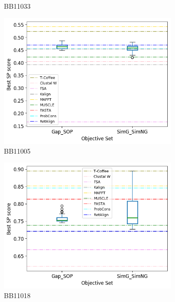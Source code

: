 \begin{figure}[!htbp]
\begin{adjustwidth}{-1cm}{-1cm}
\begin{subfigure}{0.22\textwidth}
			\caption{BB11033}
		\end{subfigure}
		\begin{subfigure}{0.22\textwidth}
			\includegraphics[width=\columnwidth]{Figure/summary/precomputedInit/Balibase/BB11005_objset_pairs_rank_2}
			\caption{BB11005}
		\end{subfigure}	
		\begin{subfigure}{0.22\textwidth}
			\includegraphics[width=\columnwidth]{Figure/summary/precomputedInit/Balibase/BB11018_objset_pairs_rank_2}
			\caption{BB11018}
		\end{subfigure}
		\begin{subfigure}{0.22\textwidth}

\end{subfigure}
\end{adjustwidth}
\end{figure}

